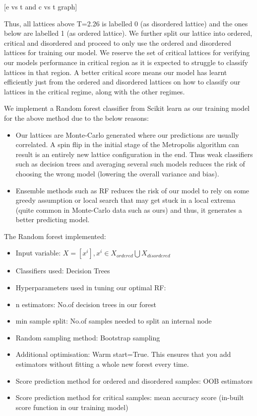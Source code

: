 [e vs t and c vs t graph]

Thus, all lattices above T=2.26 is labelled 0 (as disordered lattice) and the ones below are labelled 1 (as ordered lattice). We further split our lattice into ordered, critical and disordered and proceed to only use the ordered and disordered lattices for training our model. We reserve the set of critical lattices for verifying our models performance in critical region as it is expected to struggle to classify lattices in that region. A better critical score means our model has learnt efficiently just from the ordered and disordered lattices on how to classify our lattices in the critical regime, along with the other regimes.

We implement a Random forest classifier from Scikit learn as our training model for the above method due to the below reasons:
\begin{itemize}
    \item Our lattices are Monte-Carlo generated where our predictions are usually correlated. A spin flip in the initial stage of the Metropolis algorithm can result is an entirely new lattice configuration in the end. Thus weak classifiers such as decision trees and averaging several such models reduces the risk of choosing the wrong model (lowering the overall variance and bias).
    \item Ensemble methods such as RF reduces the risk of our model to rely on some greedy assumption or local search that may get stuck in a local extrema (quite common in Monte-Carlo data such as ours) and thus, it generates a better predicting model.
\end{itemize}

The Random forest implemented:
\begin{itemize}
    \item Input variable: \(X=[x^i],x^i\in {X_{ordered}\bigcup X_{disordered}}\)
    \item Classifiers used: Decision Trees
    \item Hyperparameters used in tuning our optimal RF:
        \item n estimators: No.of decision trees in our forest
        \item min sample split: No.of samples needed to split an internal node
    \item Random sampling method: Bootstrap sampling
    \item Additional optimisation: Warm start=True. This ensures that you add estimators without fitting a whole new forest every time.
    \item Score prediction method for ordered and disordered samples: OOB estimators
    \item Score prediction method for critical samples: mean accuracy score (in-built score function in our training model)
\end{itemize}


